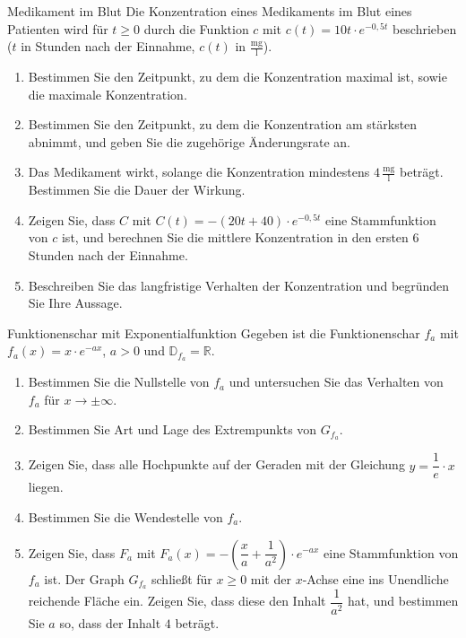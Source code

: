 
\begin{uebung}{Medikament im Blut}
Die Konzentration eines Medikaments im Blut eines Patienten wird für $t\geq 0$ durch die Funktion $c$ mit $c(t) = 10t\cdot e^{-0{,}5t}$ beschrieben ($t$ in Stunden nach der Einnahme, $c(t)$ in $\frac{\text{mg}}{\text{l}}$).
\begin{enumerate}[label=\alph*)]
  \item Bestimmen Sie den Zeitpunkt, zu dem die Konzentration maximal ist, sowie die maximale Konzentration.
  \item Bestimmen Sie den Zeitpunkt, zu dem die Konzentration am stärksten abnimmt, und geben Sie die zugehörige Änderungsrate an.
  \item Das Medikament wirkt, solange die Konzentration mindestens $4\,\frac{\text{mg}}{\text{l}}$ beträgt. Bestimmen Sie die Dauer der Wirkung.
  \item Zeigen Sie, dass $C$ mit $C(t) = -(20t+40)\cdot e^{-0{,}5t}$ eine Stammfunktion von $c$ ist, und berechnen Sie die mittlere Konzentration in den ersten $6$ Stunden nach der Einnahme.
  \item Beschreiben Sie das langfristige Verhalten der Konzentration und begründen Sie Ihre Aussage.
\end{enumerate}
\end{uebung}

\begin{uebung}{Funktionenschar mit Exponentialfunktion}
Gegeben ist die Funktionenschar $f_a$ mit $f_a(x) = x\cdot e^{-ax}$, $a>0$ und $\mathds{D}_{f_a} = \mathds{R}$.
\begin{enumerate}[label=\alph*)]
  \item Bestimmen Sie die Nullstelle von $f_a$ und untersuchen Sie das Verhalten von $f_a$ für $x\longrightarrow\pm\infty$.
  \item Bestimmen Sie Art und Lage des Extrempunkts von $G_{f_a}$.
  \item Zeigen Sie, dass alle Hochpunkte auf der Geraden mit der Gleichung $y = \dfrac{1}{e}\cdot x$ liegen.
  \item Bestimmen Sie die Wendestelle von $f_a$.
  \item Zeigen Sie, dass $F_a$ mit $F_a(x) = -\left(\dfrac{x}{a}+\dfrac{1}{a^2}\right)\cdot e^{-ax}$ eine Stammfunktion von $f_a$ ist. Der Graph $G_{f_a}$ schließt für $x\geq 0$ mit der $x$-Achse eine ins Unendliche reichende Fläche ein. Zeigen Sie, dass diese den Inhalt $\dfrac{1}{a^2}$ hat, und bestimmen Sie $a$ so, dass der Inhalt $4$ beträgt.
\end{enumerate}
\end{uebung}

